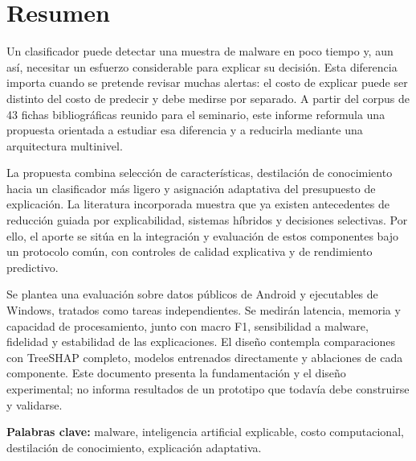 \chapter*{Resumen}
Un clasificador puede detectar una muestra de malware en poco tiempo y, aun así, necesitar un esfuerzo considerable para explicar su decisión. Esta diferencia importa cuando se pretende revisar muchas alertas: el costo de explicar puede ser distinto del costo de predecir y debe medirse por separado. A partir del corpus de 43 fichas bibliográficas reunido para el seminario, este informe reformula una propuesta orientada a estudiar esa diferencia y a reducirla mediante una arquitectura multinivel.

La propuesta combina selección de características, destilación de conocimiento hacia un clasificador más ligero y asignación adaptativa del presupuesto de explicación. La literatura incorporada muestra que ya existen antecedentes de reducción guiada por explicabilidad, sistemas híbridos y decisiones selectivas. Por ello, el aporte se sitúa en la integración y evaluación de estos componentes bajo un protocolo común, con controles de calidad explicativa y de rendimiento predictivo.

Se plantea una evaluación sobre datos públicos de Android y ejecutables de Windows, tratados como tareas independientes. Se medirán latencia, memoria y capacidad de procesamiento, junto con macro F1, sensibilidad a malware, fidelidad y estabilidad de las explicaciones. El diseño contempla comparaciones con TreeSHAP completo, modelos entrenados directamente y ablaciones de cada componente. Este documento presenta la fundamentación y el diseño experimental; no informa resultados de un prototipo que todavía debe construirse y validarse.

\noindent\textbf{Palabras clave:} malware, inteligencia artificial explicable, costo computacional, destilación de conocimiento, explicación adaptativa.
